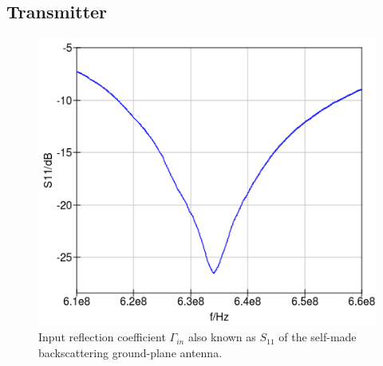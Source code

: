 \documentclass[conference]{IEEEtran}
\begin{document}
\subsection{Transmitter}
\begin{figure}[h]
\centering
\includegraphics[width=0.6\columnwidth]{./fig/s11v2}
\caption{Input reflection coefficient \ensuremath{\Gamma_{in}} also known as \ensuremath{S_{\text{11}}} of the self-made backscattering ground-plane antenna.}
\label{fig:s11}
\end{figure}
\end{document}
